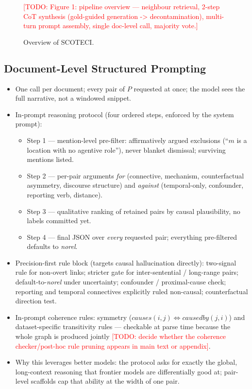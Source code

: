 \documentclass[11pt]{article}
\newcommand{\todo}[1]{\textcolor{red}{[TODO: #1]}}
\newcommand{\method}{SCOTECI}
\begin{document}
\begin{figure}[t]
  \centering
  \todo{Figure 1: pipeline overview --- neighbour retrieval, 2-step CoT
  synthesis (gold-guided generation -> decontamination), multi-turn prompt
  assembly, single doc-level call, majority vote.}
  \caption{Overview of \method{}.}
  \label{fig:overview}
\end{figure}

\subsection{Document-Level Structured Prompting}
\label{sec:docprompt}
\begin{itemize}
  \item One call per document; every pair of $P$ requested at once; the model
        sees the full narrative, not a windowed snippet.
  \item In-prompt reasoning protocol (four ordered steps, enforced by the
        system prompt):
        \begin{itemize}
          \item Step 1 --- mention-level pre-filter: affirmatively argued
                exclusions (``$m$ is a location with no agentive role''), never
                blanket dismissal; surviving mentions listed.
          \item Step 2 --- per-pair arguments \emph{for} (connective, mechanism,
                counterfactual asymmetry, discourse structure) and
                \emph{against} (temporal-only, confounder, reporting verb,
                distance).
          \item Step 3 --- qualitative ranking of retained pairs by causal
                plausibility, no labels committed yet.
          \item Step 4 --- final JSON over \emph{every} requested pair;
                everything pre-filtered defaults to \textit{norel}.
        \end{itemize}
  \item Precision-first rule block (targets causal hallucination directly):
        two-signal rule for non-overt links; stricter gate for inter-sentential
        / long-range pairs; default-to-\textit{norel} under uncertainty;
        confounder / proximal-cause check; reporting and temporal connectives
        explicitly ruled non-causal; counterfactual direction test.
  \item In-prompt coherence rules: symmetry
        ($\textit{causes}(i,j) \Leftrightarrow \textit{causedby}(j,i)$) and
        dataset-specific transitivity rules --- checkable at parse time because
        the whole graph is produced jointly \todo{decide whether the coherence
        checker/post-hoc rule pruning appears in main text or appendix}.
  \item Why this leverages better models: the protocol asks for exactly the
        global, long-context reasoning that frontier models are differentially
        good at; pair-level scaffolds cap that ability at the width of one pair.
\end{itemize}
\end{document}
